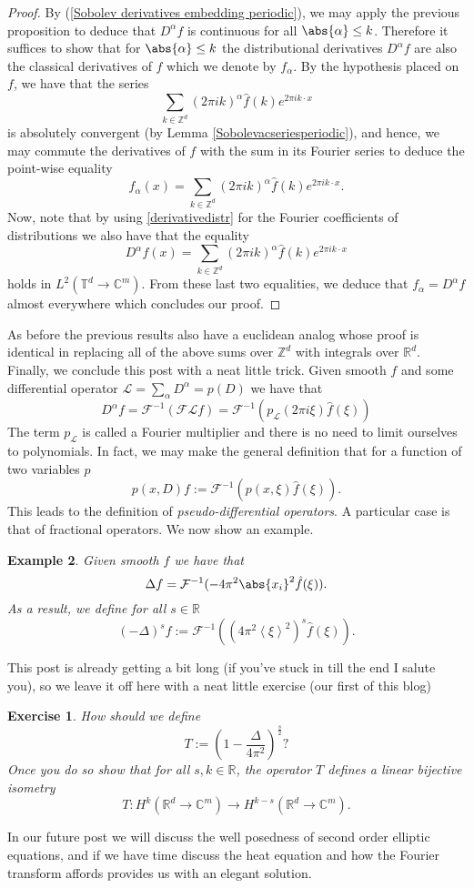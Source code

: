 \documentclass[
]{article}
\begin{document}
\emph{Proof.} By
(\protect\hyperlink{Sobolevux20derivativesux20embeddingux20periodic}{{[}Sobolev derivatives embedding periodic{]}}),
we may apply the previous proposition to deduce that \(D^\alpha f\) is
continuous for all \(\abs{\alpha}\leq k\). Therefore it suffices to show
that for \(\abs{\alpha}\leq k\) the distributional derivatives
\(D^\alpha f\) are also the classical derivatives of \(f\) which we
denote by \(f_\alpha\). By the hypothesis placed on \(f\), we have that
the series
\[\sum_{k\in{\mathbb Z}^d} (2\pi ik)^\alpha \hat{f}(k)e^{2\pi ik\cdot x}\]
is absolutely convergent (by Lemma
\protect\hyperlink{Sobolevacseriesperiodic}{{[}Sobolevacseriesperiodic{]}}),
and hence, we may commute the derivatives of \(f\) with the sum in its
Fourier series to deduce the point-wise equality
\[f_\alpha(x)=\sum_{k\in{\mathbb Z}^d} (2\pi ik)^\alpha \hat{f}(k)e^{2\pi ik\cdot x}.\]
Now, note that by using
\protect\hyperlink{derivativedistr}{{[}derivativedistr{]}} for the
Fourier coefficients of distributions we also have that the equality
\[D^\alpha f(x)=\sum_{k\in{\mathbb Z}^d} (2\pi ik)^\alpha \hat{f}(k)e^{2\pi ik\cdot x}\]
holds in \(L^2({\mathbb T}^d\to\mathbb{C}^m)\). From these last two
equalities, we deduce that \(f_\alpha=D^\alpha f\) almost everywhere
which concludes our proof.~◻

As before the previous results also have a euclidean analog whose proof
is identical in replacing all of the above sums over \({\mathbb Z}^d\)
with integrals over \({\mathbb R}^d\). Finally, we conclude this post
with a neat little trick. Given smooth \(f\) and some differential
operator \(\mathcal{L}=\sum_{\alpha} D^\alpha=p(D)\) we have that
\[D^\alpha f =\mathcal{F}^{-1}(\mathcal{F}\mathcal{L}f)=\mathcal{F}^{-1}(p_\mathcal{L}(2 \pi i\xi )\hat{f}(\xi ))\]
The term \(p_\mathcal{L}\) is called a Fourier multiplier and there is
no need to limit ourselves to polynomials. In fact, we may make the
general definition that for a function of two variables \(p\)
\[p(x,D)f:=\mathcal{F}^{-1}(p(x,\xi )\hat{f}(\xi )).\] This leads to the
definition of \emph{pseudo-differential operators}. A particular case is
that of fractional operators. We now show an example.

\textbf{Example 2}. \emph{Given smooth \(f\) we have that
\[\Delta f=\mathcal{F}^{-1}(-4 \pi^2 \abs{x_i}^2 \hat{f}(\xi )).\] As a
result, we define for all \(s\in {\mathbb R}\)
\[{(-\Delta)}^sf:=\mathcal{F}^{-1} ((4\pi^2 \left\langle\xi \right\rangle^2)^s\hat{f}(\xi )).\]}

This post is already getting a bit long (if you've stuck in till the end
I salute you), so we leave it off here with a neat little exercise (our
first of this blog)

\textbf{Exercise 1}. \emph{How should we define
\[T:=\left(1-\frac{\Delta}{4\pi ^2}  \right)^\frac{s}{2}\text{?}\] Once
you do so show that for all \(s,k \in {\mathbb R}\), the operator \(T\)
defines a linear bijective isometry
\[T: H^k({\mathbb R}^d\to\mathbb{C}^m)\to H^{k-s}({\mathbb R}^d\to\mathbb{C}^m).\]}

In our future post we will discuss the well posedness of second order
elliptic equations, and if we have time discuss the heat equation and
how the Fourier transform affords provides us with an elegant solution.
\end{document}
